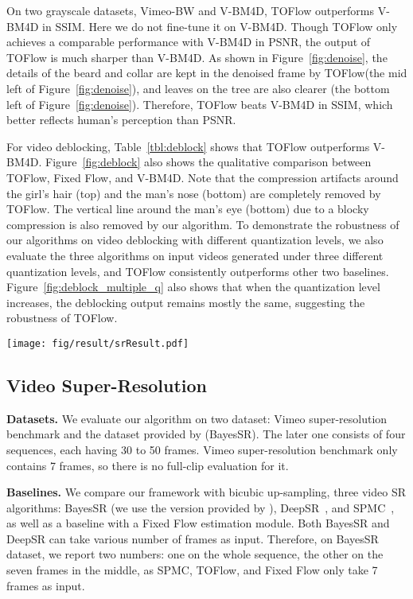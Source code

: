 \documentclass[twocolumn,natbib]{svjour3}          \smartqed  \usepackage{graphicx}
\newcommand{\fig}[1]{Figure~\ref{#1}}
\newcommand{\tbl}[1]{Table~\ref{#1}}
\def\model{TOFlow\xspace}
\def\fflow{Fixed Flow\xspace}
\def\vbm4d{V-BM4D\xspace}
\def\srbenchmark{Vimeo super-resolution benchmark\xspace}
\newcommand{\myparagraph}[1]{\vspace{5pt}\noindent\textbf{#1}}
\begin{document}
On two grayscale datasets, Vimeo-BW and \vbm4d, \model outperforms \vbm4d in SSIM. Here we do not fine-tune it on \vbm4d. Though \model only achieves a comparable performance with \vbm4d in PSNR, the output of \model is much sharper than \vbm4d. As shown in \fig{fig:denoise}, the details of the beard and collar are kept in the denoised frame by \model (the mid left of \fig{fig:denoise}), and leaves on the tree are also clearer (the bottom left of \fig{fig:denoise}). Therefore, \model beats \vbm4d in SSIM, which better reflects human's perception than PSNR.

For video deblocking, \tbl{tbl:deblock} shows that \model outperforms \vbm4d. \fig{fig:deblock} also shows the qualitative comparison between \model, \fflow, and \vbm4d. Note that the compression artifacts around the girl's hair (top) and the man's nose (bottom) are completely removed by \model. The vertical line around the man's eye (bottom) due to a blocky compression is also removed by our algorithm. To demonstrate the robustness of our algorithms on video deblocking with different quantization levels, we also evaluate the three algorithms on input videos generated under three different quantization levels, and \model consistently outperforms other two baselines. \fig{fig:deblock_multiple_q} also shows that when the quantization level increases, the deblocking output remains mostly the same, suggesting the robustness of \model.

\begin{figure*}[t]
    \centering
    \texttt{[image: fig/result/srResult.pdf]}
    \caption{Qualitative results on super-resolution. Close-up views are shown on the top left of each result. The differences are clearer when zoomed-in.}
    \label{fig:sr}
\end{figure*}

 
\subsection{Video Super-Resolution}


\myparagraph{Datasets. }
We evaluate our algorithm on two dataset: \srbenchmark and the dataset provided by \cite{liu2011bayesian} (BayesSR). The later one consists of four sequences, each having 30 to 50 frames. \srbenchmark only contains 7 frames, so there is no full-clip evaluation for it.

\myparagraph{Baselines. }
We compare our framework with bicubic up-sampling, three 
video SR algorithms: BayesSR (we use the version provided by \cite{ma2015handling}), DeepSR~\citep{liao2015video}, and SPMC~\citep{tao2017detail}, as well as a baseline with a \fflow estimation module. Both BayesSR and DeepSR can take various number of frames as input. Therefore, on BayesSR dataset, we report two numbers: one on the whole sequence, the other on the seven frames in the middle, as SPMC, \model, and \fflow only take 7 frames as input.
\end{document}
